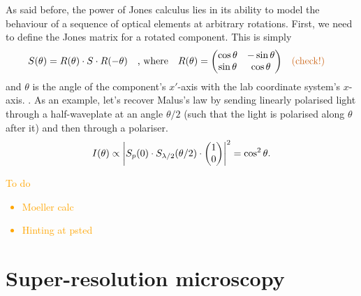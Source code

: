 As said before, the power of Jones calculus lies in its ability to model the behaviour of a sequence of optical elements at arbitrary rotations. First, we need to define the Jones matrix for a rotated component. This is simply
\begin{equation}
	S(\theta) = R(\theta) \cdot S \cdot R(-\theta) 
	\qq{, where} 
	R(\theta) = \mqty(\cos\theta & -\sin\theta \\ \sin\theta & \cos\theta) \qq{\todo{check!}}
\end{equation}
and $ \theta $ is the angle of the component's $ x' $-axis with the lab coordinate system's $ x $-axis. . As an example, let's recover Malus's law by sending linearly polarised light through a half-waveplate at an angle $ \theta/2 $ (such that the light is polarised along $ \theta $ after it) and then through a polariser.
\begin{equation}
	I(\theta) \propto \abs{S_p(0) \cdot S_\hwp(\theta/2) \cdot \mqty(\admat{1 \\ 0})}^2 = \cos^2\theta.
\end{equation}

\textcolor{orange}{
To do 
\begin{itemize}
	\item Moeller calc	
	\item Hinting at psted
\end{itemize}
}

\section{Super-resolution microscopy}
